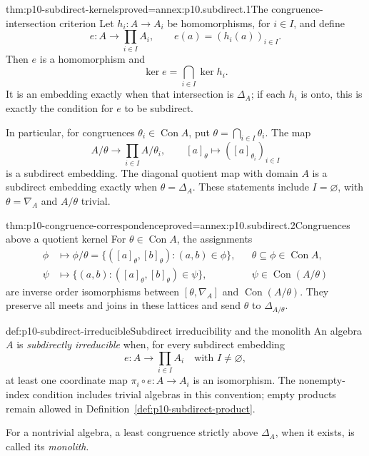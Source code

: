 \begin{hbtheorem}{thm:p10-subdirect-kernels}{proved=annex:p10.subdirect.1}{The congruence-intersection criterion}
Let \(h_i:A\to A_i\) be homomorphisms, for \(i\in I\), and define
\[
 e:A\longrightarrow\prod_{i\in I}A_i,\qquad
 e(a)=(h_i(a))_{i\in I}.
\]
Then \(e\) is a homomorphism and
\[
 \ker e=\bigcap_{i\in I}\ker h_i.
\]
It is an embedding exactly when that intersection is \(\Delta_A\);
if each \(h_i\) is onto, this is exactly the condition for \(e\) to
be subdirect.

In particular, for congruences \(\theta_i\in\operatorname{Con}A\),
put \(\theta=\bigcap_{i\in I}\theta_i\).  The map
\[
 A/\theta\longrightarrow\prod_{i\in I}A/\theta_i,\qquad
 [a]_\theta\longmapsto([a]_{\theta_i})_{i\in I}
\]
is a subdirect embedding.  The diagonal quotient map with domain
\(A\) is a subdirect embedding exactly when \(\theta=\Delta_A\).
These statements include \(I=\varnothing\), with
\(\theta=\nabla_A\) and \(A/\theta\) trivial.
\end{hbtheorem}

\begin{hbtheorem}{thm:p10-congruence-correspondence}{proved=annex:p10.subdirect.2}{Congruences above a quotient kernel}
For \(\theta\in\operatorname{Con}A\), the assignments
\[
\begin{aligned}
 \phi&\longmapsto
 \phi/\theta
   =\{([a]_\theta,[b]_\theta):(a,b)\in\phi\},
       &&\theta\subseteq\phi\in\operatorname{Con}A,\\
 \psi&\longmapsto
 \{(a,b):([a]_\theta,[b]_\theta)\in\psi\},
       &&\psi\in\operatorname{Con}(A/\theta)
\end{aligned}
\]
are inverse order isomorphisms between
\([\theta,\nabla_A]\) and \(\operatorname{Con}(A/\theta)\).
They preserve all meets and joins in these lattices and send
\(\theta\) to \(\Delta_{A/\theta}\).
\end{hbtheorem}

\begin{hbdefinition}{def:p10-subdirect-irreducible}{Subdirect irreducibility and the monolith}
An algebra \(A\) is \emph{subdirectly irreducible} when, for every
subdirect embedding
\[
 e:A\longrightarrow\prod_{i\in I}A_i
 \quad\text{with }I\ne\varnothing,
\]
at least one coordinate map \(\pi_i\circ e:A\to A_i\) is an
isomorphism.  The nonempty-index condition includes trivial algebras
in this convention; empty products remain allowed in
Definition~\ref{def:p10-subdirect-product}.

For a nontrivial algebra, a least congruence strictly above
\(\Delta_A\), when it exists, is called its \emph{monolith}.
\end{hbdefinition}

